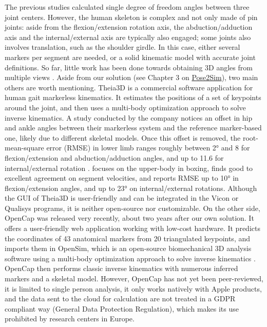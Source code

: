 \newpage
The previous studies calculated single degree of freedom angles between three joint centers. However, the human skeleton is complex and not only made of pin joints: aside from the flexion/extension rotation axis, the abduction/adduction axis and the internal/external axis are typically also engaged; some joints also involves translation, such as the shoulder girdle. In this case, either several markers per segment are needed, or a solid kinematic model with accurate joint definitions. So far, little work has been done towards obtaining 3D angles from multiple views \cite{Zheng2022}. Aside from our solution (see Chapter 3 on \hyperref[ch:3]{Pose2Sim}), two main others are worth mentioning. Theia3D is a commercial software application for human gait markerless kinematics. It estimates the positions of a set of keypoints around the joint, and then uses a multi-body optimization approach to solve inverse kinematics. A study conducted by the company notices an offset in hip and ankle angles between their markerless system and the reference marker-based one, likely due to different skeletal models. Once this offset is removed, the root-mean-square error (RMSE) in lower limb ranges roughly between 2° and 8\degree{} for flexion/extension and abduction/adduction angles, and up to 11.6\degree{} for internal/external rotation \cite{Kanko2021b}. \cite{Lahkar2022b} focuses on the upper-body in boxing, finds good to excellent agreement on segment velocities, and reports RMSE up to 10° in  flexion/extension angles, and up to 23° on internal/external rotations. Although the GUI of Theia3D is user-friendly and can be integrated in the Vicon or Qualisys programs, it is neither open-source nor customizable. On the other side, OpenCap \cite{Uhlrich2022} was released very recently, about two years after our own solution. It offers a user-friendly web application working with low-cost hardware. It predicts the coordinates of 43 anatomical markers from 20 triangulated keypoints, and imports them in OpenSim, which is an open-source biomechanical 3D analysis software using a multi-body optimization approach to solve inverse kinematics \cite{Delp2007,Seth2018}. OpenCap then performs classic inverse kinematics with numerous inferred markers and a skeletal model. However, OpenCap has not yet been peer-reviewed, it is limited to single person analysis, it only works natively with Apple products, and the data sent to the cloud for calculation are not treated in a GDPR compliant way (General Data Protection Regulation), which makes its use prohibited by research centers in Europe.

